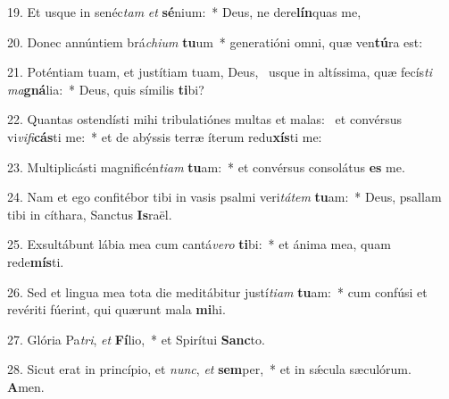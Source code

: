 19. Et usque in senéc\textit{tam} \textit{et} \textbf{sé}nium:~*  Deus, ne dere\textbf{lín}quas me,\

20. Donec annúntiem brá\textit{chi}\textit{um} \textbf{tu}um~*  generatióni omni, quæ ven\textbf{tú}ra est:\

21. Poténtiam tuam, et justítiam tuam, Deus, \dag\  usque in altíssima, quæ fecís\textit{ti} \textit{ma}\textbf{gná}lia:~*  Deus, quis símilis \textbf{ti}bi?\

22. Quantas ostendísti mihi tribulatiónes multas et malas: \dag\  et convérsus vi\textit{vi}\textit{fi}\textbf{cás}ti me:~*  et de abýssis terræ íterum redu\textbf{xís}ti me:\

23. Multiplicásti magnificén\textit{ti}\textit{am} \textbf{tu}am:~*  et convérsus consolátus \textbf{es} me.\

24. Nam et ego confitébor tibi in vasis psalmi veri\textit{tá}\textit{tem} \textbf{tu}am:~*  Deus, psallam tibi in cíthara, Sanctus \textbf{Is}raël.\

25. Exsultábunt lábia mea cum cantá\textit{ve}\textit{ro} \textbf{ti}bi:~*  et ánima mea, quam rede\textbf{mís}ti.\

26. Sed et lingua mea tota die meditábitur justí\textit{ti}\textit{am} \textbf{tu}am:~*  cum confúsi et revériti fúerint, qui quærunt mala \textbf{mi}hi.\

27. Glória Pa\textit{tri}, \textit{et} \textbf{Fí}lio,~*  et Spirítui \textbf{Sanc}to.\

28. Sicut erat in princípio, et \textit{nunc}, \textit{et} \textbf{sem}per,~*  et in sǽcula sæculórum. \textbf{A}men.\

